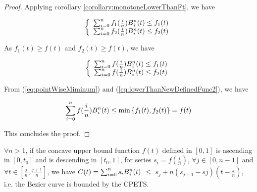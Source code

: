 \begin{proof}
Applying corollary \ref{corollary:monotoneLowerThanFt}, we have

\begin{equation}\begin{split}
\left\{
\begin{array}{l}
\sum_{i=0}^{n}f_{1}(\frac{i}{n})B\textsupsub{$n$}{$i$}(t) \le f_{1}(t) \\
\sum_{i=0}^{n}f_{2}(\frac{i}{n})B\textsupsub{$n$}{$i$}(t) \le f_{2}(t)
\end{array}
\right. 
\label{eq:lowerThanNewDefinedFunc}
\end{split}\end{equation}

As $f_{1}(t) \ge f(t)$ and $f_{2}(t) \ge f(t)$, we have

\begin{equation}\begin{split}
\left\{
\begin{array}{l}
\sum_{i=0}^{n}f(\frac{i}{n})B\textsupsub{$n$}{$i$}(t) \le f_{1}(t) \\
\sum_{i=0}^{n}f(\frac{i}{n})B\textsupsub{$n$}{$i$}(t) \le f_{2}(t)
\end{array}
\right. 
\label{eq:lowerThanNewDefinedFunc2}
\end{split}\end{equation}

From (\ref{eq:pointWiseMiminum}) and (\ref{eq:lowerThanNewDefinedFunc2}), we have

\begin{equation}\begin{split}
\sum_{i=0}^{n}f(\frac{i}{n})B\textsupsub{$n$}{$i$}(t) \le \text{min} \left\{f_{1}(t), f_{2}(t) \right\} = f(t)
\label{eq:lowerThanNewDefinedFunc3}
\end{split}\end{equation}

This concludes the proof.
\end{proof}

\begin{corollary}
$\forall n > 1$, if the concave upper bound function $f(t)$ defined in $\left[0,1\right]$ is ascending in $\left[0, t_{0}\right]$ and is descending in $\left[t_{0}, 1\right]$, for series $s_{i}=f(\frac{i}{n})$, $\forall j \in \left[0, n-1\right]$ and 
$\forall t \in \left[\frac{j}{n}, \frac{j+1}{n}\right]$, we have $C(t)=\sum_{i=0}^{n}s_{i}B\textsupsub{$n$}{$i$}(t)$ $\le$ $s_{j}+n(s_{j+1}-s{j})(t-\frac{j}{n})$, i.e. the Bezier curve is bounded by the CPETS.
\label{lemma:ascendingNdescendingCPETS}
\end{corollary}

